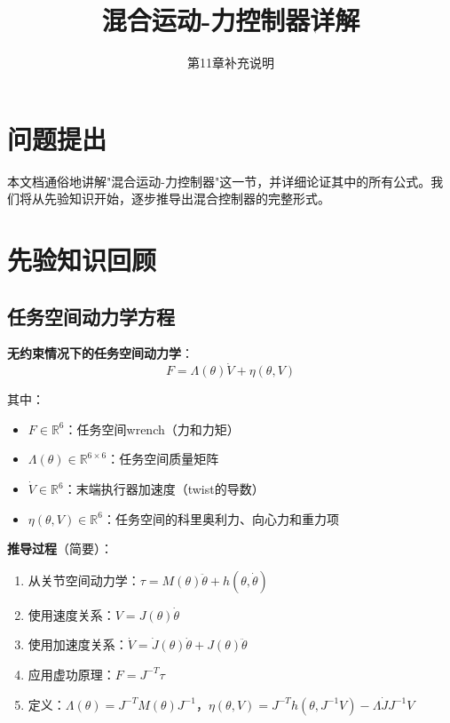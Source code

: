 \documentclass[12pt,a4paper]{article}
\title{混合运动-力控制器详解}
\author{第11章补充说明}
\date{}
\begin{document}
\maketitle

\section{问题提出}

本文档通俗地讲解"混合运动-力控制器"这一节，并详细论证其中的所有公式。我们将从先验知识开始，逐步推导出混合控制器的完整形式。

\section{先验知识回顾}

\subsection{任务空间动力学方程}

\textbf{无约束情况下的任务空间动力学}：
\begin{equation}
F = \Lambda(\theta)\dot{V} + \eta(\theta, V) \tag{11.55}
\end{equation}

其中：
\begin{itemize}
\item $F \in \mathbb{R}^6$：任务空间wrench（力和力矩）
\item $\Lambda(\theta) \in \mathbb{R}^{6 \times 6}$：任务空间质量矩阵
\item $\dot{V} \in \mathbb{R}^6$：末端执行器加速度（twist的导数）
\item $\eta(\theta, V) \in \mathbb{R}^6$：任务空间的科里奥利力、向心力和重力项
\end{itemize}

\textbf{推导过程}（简要）：
\begin{enumerate}
\item 从关节空间动力学：$\tau = M(\theta)\ddot{\theta} + h(\theta, \dot{\theta})$
\item 使用速度关系：$V = J(\theta)\dot{\theta}$
\item 使用加速度关系：$\dot{V} = \dot{J}(\theta)\dot{\theta} + J(\theta)\ddot{\theta}$
\item 应用虚功原理：$F = J^{-T}\tau$
\item 定义：$\Lambda(\theta) = J^{-T}M(\theta)J^{-1}$，$\eta(\theta, V) = J^{-T}h(\theta, J^{-1}V) - \Lambda\dot{J}J^{-1}V$
\end{enumerate}
\end{document}
